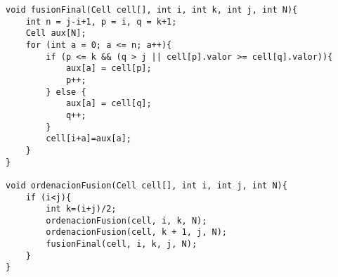 \begin{lstlisting}
void fusionFinal(Cell cell[], int i, int k, int j, int N){
    int n = j-i+1, p = i, q = k+1;
    Cell aux[N];
    for (int a = 0; a <= n; a++){
        if (p <= k && (q > j || cell[p].valor >= cell[q].valor)){
            aux[a] = cell[p];
            p++;
        } else {
            aux[a] = cell[q];
            q++;
        }
        cell[i+a]=aux[a];
    }
}

void ordenacionFusion(Cell cell[], int i, int j, int N){
    if (i<j){
        int k=(i+j)/2;
        ordenacionFusion(cell, i, k, N);
        ordenacionFusion(cell, k + 1, j, N);
        fusionFinal(cell, i, k, j, N);
    }
}
\end{lstlisting}